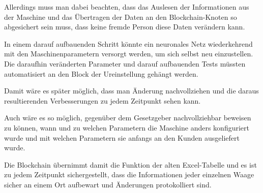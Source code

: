 Allerdings muss man dabei beachten, dass das Auslesen der Informationen aus der Maschine und das Übertragen der Daten
an den Blockchain-Knoten so abgesichert sein muss, dass keine fremde Person diese Daten verändern kann.

In einem darauf aufbauenden Schritt könnte ein neuronales Netz wiederkehrend mit den Maschinenparametern versorgt
werden, um sich selbst neu einzustellen. Die daraufhin veränderten Parameter und darauf aufbauenden Tests müssten
automatisiert an den Block der Ureinstellung gehängt werden.

Damit wäre es später möglich, dass man Änderung nachvollziehen und die daraus resultierenden Verbesserungen zu jedem
Zeitpunkt sehen kann.

Auch wäre es so möglich, gegenüber dem Gesetzgeber nachvollziehbar beweisen zu können, wann und zu welchen Parametern
die Maschine anders konfiguriert wurde und mit welchen Parametern sie anfangs an den Kunden ausgeliefert wurde.

Die Blockchain übernimmt damit die Funktion der alten Excel-Tabelle und es ist zu jedem Zeitpunkt sichergestellt, dass
die Informationen jeder einzelnen Waage sicher an einem Ort aufbewart und Änderungen protokolliert sind.